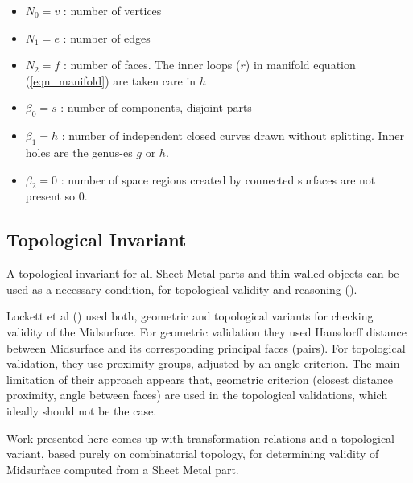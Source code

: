 \begin{itemize}
[noitemsep,topsep=2pt,parsep=2pt,partopsep=2pt,label={},leftmargin=*]
\item $N_{0} = v$ : number of vertices
\item $N_{1} = e$ : number of edges
\item $N_{2} = f$ : number of faces. The inner loops ($r$) in manifold equation (\ref{eqn_manifold})  are taken care in $h$
\item $\beta_{0} = s$ : number of components, disjoint parts
\item $\beta_{1} = h$ : number of independent closed curves drawn without splitting. Inner holes are the genus-es $g$ or $h$. 
\item $\beta_{2} = 0$ : number of space regions created by connected surfaces are not present so $0$.
\end{itemize}



\subsection{Topological Invariant}
A topological invariant for all Sheet Metal parts and thin walled objects can be used as a necessary condition, for topological validity and reasoning (\cite{Lipson}).  

Lockett et al (\cite{Lockett2008}) used both, geometric and topological variants for checking validity of the Midsurface. For geometric validation they used Hausdorff distance between Midsurface and its corresponding principal faces (pairs). For topological validation, they use proximity groups, adjusted by an angle criterion. The main limitation of their approach appears that, geometric criterion (closest distance proximity, angle between faces) are used in the topological validations, which ideally should not be the case.

Work presented here comes up with transformation relations and a topological variant, based purely on combinatorial topology, for determining validity of Midsurface computed from a Sheet Metal part.